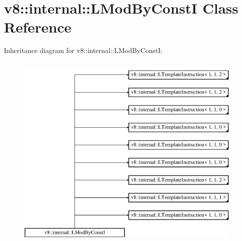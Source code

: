 \hypertarget{classv8_1_1internal_1_1_l_mod_by_const_i}{}\section{v8\+:\+:internal\+:\+:L\+Mod\+By\+ConstI Class Reference}
\label{classv8_1_1internal_1_1_l_mod_by_const_i}
Inheritance diagram for v8\+:\+:internal\+:\+:L\+Mod\+By\+ConstI\+:\begin{figure}[H]
\begin{center}
\leavevmode
\includegraphics[height=10.000000cm]{classv8_1_1internal_1_1_l_mod_by_const_i}
\end{center}
\end{figure}
